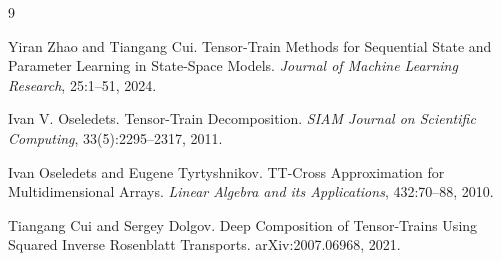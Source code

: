 \documentclass[11pt]{article}
\begin{document}
\begin{thebibliography}{9}

Yiran Zhao and Tiangang Cui.
\newblock Tensor-Train Methods for Sequential State and Parameter Learning in
State-Space Models.
\newblock \emph{Journal of Machine Learning Research}, 25:1--51, 2024.

Ivan V. Oseledets.
\newblock Tensor-Train Decomposition.
\newblock \emph{SIAM Journal on Scientific Computing}, 33(5):2295--2317, 2011.

Ivan Oseledets and Eugene Tyrtyshnikov.
\newblock TT-Cross Approximation for Multidimensional Arrays.
\newblock \emph{Linear Algebra and its Applications}, 432:70--88, 2010.

Tiangang Cui and Sergey Dolgov.
\newblock Deep Composition of Tensor-Trains Using Squared Inverse Rosenblatt
Transports.
\newblock arXiv:2007.06968, 2021.

\end{thebibliography}
\end{document}
